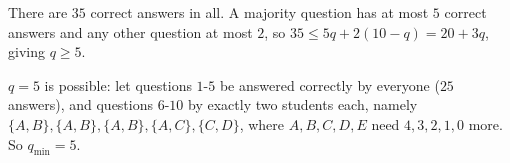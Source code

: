 There are $35$ correct answers in all. A majority question has at most $5$ correct answers and any other question at most $2$, so $35\le5q+2(10-q)=20+3q$, giving $q\ge5$.

$q=5$ is possible: let questions $1$-$5$ be answered correctly by everyone ($25$ answers), and questions $6$-$10$ by exactly two students each, namely $\{A,B\},\{A,B\},\{A,B\},\{A,C\},\{C,D\}$, where $A,B,C,D,E$ need $4,3,2,1,0$ more. So $q_{\min}=\boxed{5}$.
